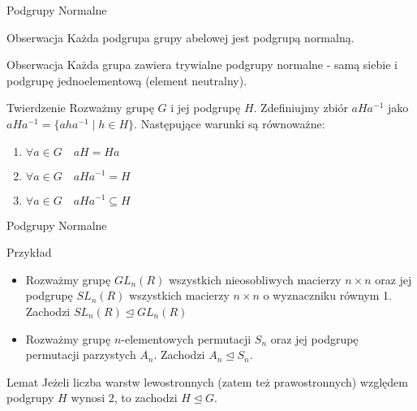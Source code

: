 \documentclass{beamer}
\begin{document}
\begin{frame}{Podgrupy Normalne}
    \begin{alertblock}{Obserwacja}
        Każda podgrupa grupy abelowej jest podgrupą normalną.
    \end{alertblock}
    \pause 
    \begin{alertblock}{Obserwacja}
        Każda grupa zawiera trywialne podgrupy normalne - samą siebie i podgrupę jednoelementową (element neutralny). 
    \end{alertblock}
    \pause 
    \begin{block}{Twierdzenie}
        Rozważmy grupę $G$ i jej podgrupę $H$. Zdefiniujmy zbiór  $aHa^{-1}$ jako $aHa^{-1} = \{aha^{-1} \mid h \in H\}$. Następujące warunki są równoważne:
        \begin{enumerate}
            \item $\forall a \in G \quad aH = Ha$ 
            \item $\forall a \in G \quad aHa^{-1} = H$
            \item $\forall a \in G \quad aHa^{-1} \subseteq H$
        \end{enumerate}
    \end{block}
\end{frame}

\begin{frame}{Podgrupy Normalne}
    \begin{exampleblock}{Przykład}
        \begin{itemize}
            \item Rozważmy grupę $GL_n(R)$ wszystkich nieosobliwych macierzy $n \times n$ oraz jej podgrupę $SL_n(R)$ wszystkich macierzy $n\times n$ o wyznaczniku równym 1. Zachodzi $SL_n(R) \trianglelefteq GL_n(R)$
            \item Rozważmy grupę $n$-elementowych permutacji $S_n$ oraz jej podgrupę permutacji parzystych $A_n$. Zachodzi $A_n \trianglelefteq S_n.$
        \end{itemize}
    \end{exampleblock}
    \pause
    \begin{block}{Lemat}
        Jeżeli liczba warstw lewostronnych (zatem też prawostronnych) względem podgrupy $H$ wynosi $2$, to zachodzi $H \trianglelefteq G$.
    \end{block}
\end{frame}
\end{document}
